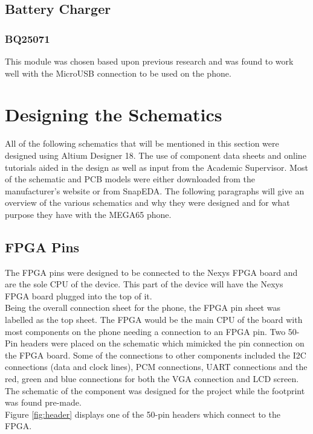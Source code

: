 
\subsection{Battery Charger}
\label{chap:charger}
\subsubsection{BQ25071}
	This module was chosen based upon previous research \cite{Puranikthesis:report} and was found to work well with the MicroUSB connection to be used on the phone. 
		

\section{Designing the Schematics}
\label{chap5sec2}

	All of the following schematics that will be mentioned in this section were designed using Altium Designer 18. 
The use of component data sheets and online tutorials aided in the design as well as input from the Academic Supervisor. 
Most of the schematic and PCB models were either downloaded from the manufacturer's website or from SnapEDA. 
The following paragraphs will give an overview of the various schematics and why they were designed and for what purpose they have with the MEGA65 phone.

\subsection{FPGA Pins}
\label{chap:FPGA}
	The FPGA pins were designed to be connected to the Nexys FPGA board and are the sole CPU of the device. 
This part of the device will have the Nexys FPGA board plugged into the top of it.\\
Being the overall connection sheet for the phone, the FPGA pin sheet was labelled as the top sheet. 
The FPGA would be the main CPU of the board with most components on the phone needing a connection to an FPGA pin. 
Two 50-Pin headers were placed on the schematic which mimicked the pin connection on the FPGA board. 
Some of the connections to other components included the I2C connections (data and clock lines), PCM connections, UART connections and the red, green and blue connections for both the VGA connection and LCD screen.\\
The schematic of the component was designed for the project while the footprint was found pre-made.\\
Figure \ref{fig:header} displays one of the 50-pin headers which connect to the FPGA.

